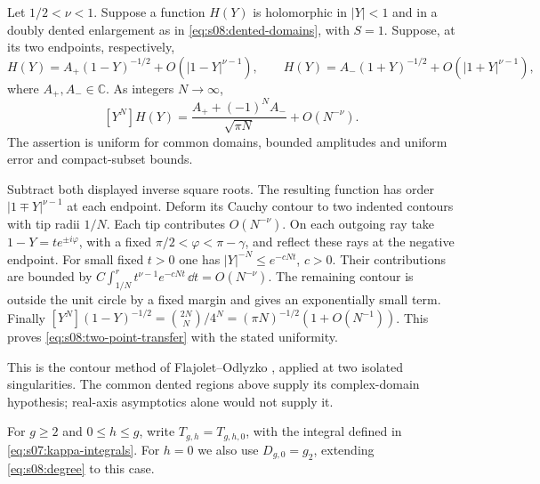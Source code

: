 \begin{lmm}\label{lmm:s08:transfer}
Let $1/2<\nu<1$. Suppose a function $H(Y)$ is holomorphic in
$|Y|<1$ and in a doubly dented enlargement as in
\eqref{eq:s08:dented-domains}, with $S=1$. Suppose, at its two
endpoints, respectively,
\[
 H(Y)=A_+(1-Y)^{-1/2}+O(|1-Y|^{\nu-1}),\qquad
 H(Y)=A_-(1+Y)^{-1/2}+O(|1+Y|^{\nu-1}),
\]
where $A_+,A_-\in\mathbb C$. As integers $N\to\infty$,
\begin{equation}\label{eq:s08:two-point-transfer}
 [Y^N]H(Y)=\frac{A_++(-1)^NA_-}{\sqrt{\pi N}}
                                     +O(N^{-\nu}).
\end{equation}
The assertion is uniform for common domains, bounded amplitudes
and uniform error and compact-subset bounds.
\end{lmm}
\begin{prf}
Subtract both displayed inverse square roots. The resulting function
has order $|1\mp Y|^{\nu-1}$ at each endpoint. Deform its Cauchy
contour to two indented contours with tip radii $1/N$. Each tip
contributes $O(N^{-\nu})$. On each outgoing ray take
$1-Y=t e^{\pm i\varphi}$, with a fixed
$\pi/2<\varphi<\pi-\gamma$, and reflect these rays at the
negative endpoint. For small fixed $t>0$ one has
$|Y|^{-N}\leq e^{-cNt}$, $c>0$. Their contributions are bounded by
$C\int_{1/N}^{r}t^{\nu-1}e^{-cNt}\,\dd t=O(N^{-\nu})$.
The remaining contour is outside the unit circle by a fixed margin
and gives an exponentially small term. Finally
$[Y^N](1-Y)^{-1/2}=\binom{2N}{N}/4^N
=(\pi N)^{-1/2}(1+O(N^{-1}))$.
This proves \eqref{eq:s08:two-point-transfer} with the stated
uniformity.
\end{prf}

\begin{rmk}
This is the contour method of Flajolet--Odlyzko
\cite[\S 2]{FO90}, applied at two isolated singularities. The common
dented regions above supply its complex-domain hypothesis; real-axis
asymptotics alone would not supply it.
\end{rmk}

For $g\geq2$ and $0\leq h\leq g$, write
$T_{g,h}=T_{g,h,0}$, with the integral defined in
\eqref{eq:s07:kappa-integrals}. For $h=0$ we also use
$D_{g,0}=g_2$, extending \eqref{eq:s08:degree} to this case.

